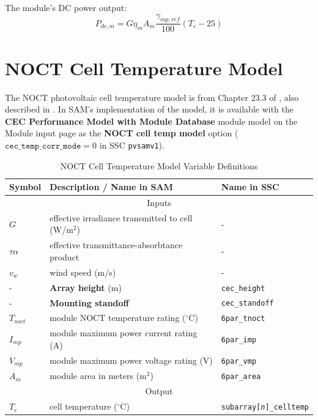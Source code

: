 \documentclass[12pt,letterpaper]{article}
\begin{document}
The module's DC power output:
\begin{equation}
P_{dc,m} = G \eta_m A_m \frac{\gamma_{mp,ref}}{100} (T_c - 25)
\end{equation}


\section{NOCT Cell Temperature Model} \label{sec-tcnoct}

The NOCT photovoltaic cell temperature model is from Chapter 23.3 of \citet{duffie2013}, also described in \citet{desoto2004b}. In SAM's implementation of the model, it is available with the \textbf{CEC Performance Model with Module Database} module model on the Module input page as the \textbf{NOCT cell temp model} option ($\mathtt{cec\_temp\_corr\_mode}=0$ in SSC \texttt{pvsamv1}).

\begin{table}
\begin{center}
\caption{NOCT Cell Temperature Model Variable Definitions}
\begin{tabular}{lll}
\midrule
Symbol & Description / \textbf{Name in SAM} & Name in SSC \\
\midrule
\multicolumn{3}{c}{Inputs}\\
$G$ & effective irradiance transmitted to cell (W/m$^2$)& - \\
$\tau \alpha$ & effective transmittance-absorbtance product & - \\
$v_{w}$ & wind speed (m/s) & - \\
- & \textbf{Array height} (m)& \texttt{cec\_height} \\
- & \textbf{Mounting standoff} & \texttt{cec\_standoff} \\
$T_{noct}$ & module NOCT temperature rating ($^\circ$C)& \texttt{6par\_tnoct} \\
$I_{mp}$ & module maximum power current rating (A)& \texttt{6par\_imp} \\
$V_{mp}$ & module maximum power voltage rating (V) & \texttt{6par\_vmp} \\
$A_m$ & module area in meters (m$^2$)& \texttt{6par\_area} \\
\midrule
\multicolumn{3}{c}{Output}\\
$T_c$ & cell temperature ($^\circ$C)& \texttt{subarray[\textit{n}]\_celltemp} \\
\hline
\end{tabular}
\label{tab-tempnoct}
\end{center}
\end{table}
\end{document}
